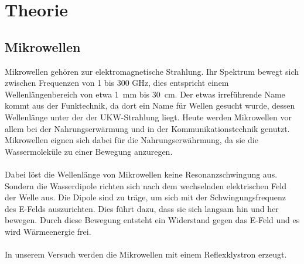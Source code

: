 \section{Theorie}
\label{sec:Theorie}

\subsection{Mikrowellen}
Mikrowellen gehören zur elektromagnetische Strahlung.
Ihr Spektrum bewegt sich zwischen Frequenzen von 1 bis 300 \si{\giga\Hz}, dies entspricht einem Wellenlängenbereich von etwa \SI{1}{\milli\meter} bis \SI{30}{\centi\meter}.
Der etwas irreführende Name kommt aus der Funktechnik, da dort ein Name für Wellen gesucht wurde, dessen Wellenlänge unter der der UKW-Strahlung liegt.
Heute werden Mikrowellen vor allem bei der Nahrungserwärmung und in der Kommunikationstechnik genutzt.
Mikrowellen eignen sich dabei für die Nahrungserwährmung, da sie die Wassermoleküle zu einer Bewegung anzuregen.
\\\\
Dabei löst die Wellenlänge von Mikrowellen keine Resonanzschwingung aus. 
Sondern die Wasserdipole richten sich nach dem wechselnden elektrischen Feld der Welle aus.
Die Dipole sind zu träge, um sich mit der Schwingungsfrequenz des E-Felds auszurichten. 
Dies führt dazu, dass sie sich langsam hin und her bewegen.
Durch diese Bewegung entsteht ein Widerstand gegen das E-Feld und es wird Wärmeenergie frei.
\\\\
In unserem Versuch werden die Mikrowellen mit einem Reflexklystron erzeugt.

